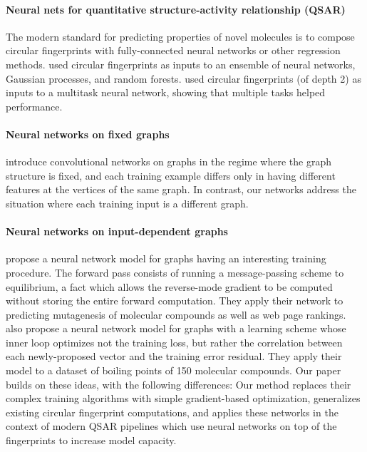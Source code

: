 \documentclass{article}
\begin{document}
\paragraph{Neural nets for quantitative structure-activity relationship (QSAR)}
The modern standard for predicting properties of novel molecules is to compose circular fingerprints with fully-connected neural networks or other regression methods.
\cite{dahl2014multi} used circular fingerprints as inputs to an ensemble of neural networks, Gaussian processes, and random forests.
\cite{ramsundar2015massively} used circular fingerprints (of depth 2) as inputs to a multitask neural network, showing that multiple tasks helped performance.


\paragraph{Neural networks on fixed graphs}
\cite{bruna2013spectral} introduce convolutional networks on graphs in the regime where the graph structure is fixed, and each training example differs only in having different features at the vertices of the same graph.
In contrast, our networks address the situation where each training input is a different graph.

\paragraph{Neural networks on input-dependent graphs}
\cite{graphnn2009} propose a neural network model for graphs having an interesting training procedure.
The forward pass consists of running a message-passing scheme to equilibrium, a fact which allows the reverse-mode gradient to be computed without storing the entire forward computation.
They apply their network to predicting mutagenesis of molecular compounds as well as web page rankings.
\cite{micheli2009neural} also propose a neural network model for graphs with a learning scheme whose inner loop optimizes not the training loss, but rather the correlation between each newly-proposed vector and the training error residual.
They apply their model to a dataset of boiling points of 150 molecular compounds.
Our paper builds on these ideas, with the following differences:
Our method replaces their complex training algorithms with simple gradient-based optimization, generalizes existing circular fingerprint computations, and applies these networks in the context of modern QSAR pipelines which use neural networks on top of the fingerprints to increase model capacity.
\end{document}
